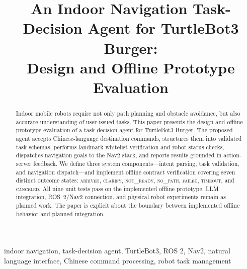 \documentclass[conference]{IEEEtran}
\begin{document}
\title{An Indoor Navigation Task-Decision Agent for TurtleBot3 Burger:\\
Design and Offline Prototype Evaluation}

\author{
  \and
}

\maketitle

\begin{abstract}
Indoor mobile robots require not only path planning and obstacle avoidance, but
also accurate understanding of user-issued tasks. This paper presents the design
and offline prototype evaluation of a task-decision agent for TurtleBot3 Burger.
The proposed agent accepts Chinese-language destination commands, structures them
into validated task schemas, performs landmark whitelist verification and robot
status checks, dispatches navigation goals to the Nav2 stack, and reports results
grounded in action-server feedback. We define three system components---intent
parsing, task validation, and navigation dispatch---and implement offline contract
verification covering seven distinct outcome states: \textsc{arrived},
\textsc{clarify}, \textsc{not\_ready}, \textsc{no\_path}, \textsc{failed},
\textsc{timeout}, and \textsc{canceled}. All nine unit tests pass on the implemented
offline prototype. LLM integration, ROS~2/Nav2 connection, and physical robot
experiments remain as planned work. The paper is explicit about the boundary between
implemented offline behavior and planned integration.
\end{abstract}

\begin{IEEEkeywords}
indoor navigation, task-decision agent, TurtleBot3, ROS 2, Nav2, natural language
interface, Chinese command processing, robot task management
\end{IEEEkeywords}
\end{document}
